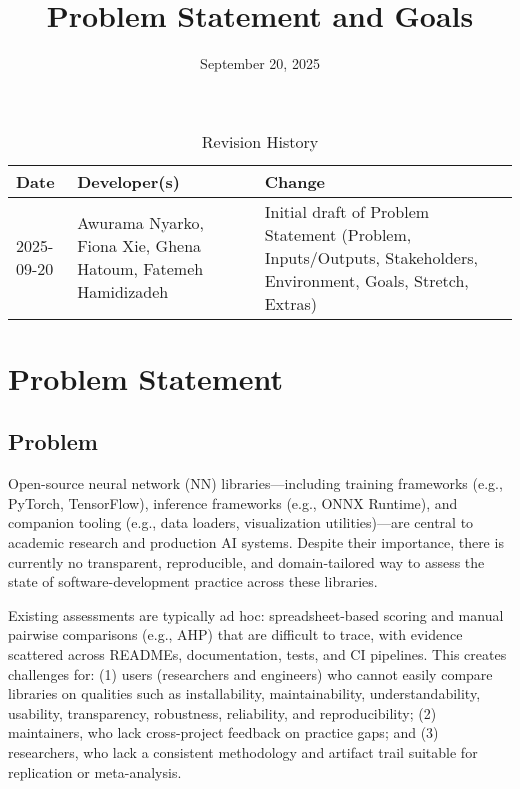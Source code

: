 \documentclass{article}
\title{Problem Statement and Goals\\\progname}
\author{\authname}
\date{September 20, 2025}
\begin{document}
\maketitle

\begin{table}[hp]
\caption{Revision History} \label{TblRevisionHistory}
\begin{tabularx}{\textwidth}{llX}
\toprule
\textbf{Date} & \textbf{Developer(s)} & \textbf{Change}\\
\midrule
2025-09-20 & Awurama Nyarko, Fiona Xie, Ghena Hatoum, Fatemeh Hamidizadeh & Initial draft of Problem Statement (Problem, Inputs/Outputs, Stakeholders, Environment, Goals, Stretch, Extras)\\
\bottomrule
\end{tabularx}
\end{table}

\section{Problem Statement}



\subsection{Problem}
Open-source neural network (NN) libraries---including training frameworks
(e.g., PyTorch, TensorFlow), inference frameworks (e.g., ONNX Runtime),
and companion tooling (e.g., data loaders, visualization utilities)---are central
to academic research and production AI systems. Despite their importance,
there is currently no transparent, reproducible, and domain-tailored way to
assess the state of software-development practice across these libraries.

Existing assessments are typically ad hoc: spreadsheet-based scoring and
manual pairwise comparisons (e.g., AHP) that are difficult to trace, with
evidence scattered across READMEs, documentation, tests, and CI
pipelines. This creates challenges for: (1) users (researchers and engineers)
who cannot easily compare libraries on qualities such as installability,
maintainability, understandability, usability, transparency, robustness,
reliability, and reproducibility; (2) maintainers, who lack cross-project
feedback on practice gaps; and (3) researchers, who lack a consistent
methodology and artifact trail suitable for replication or meta-analysis.
\end{document}
